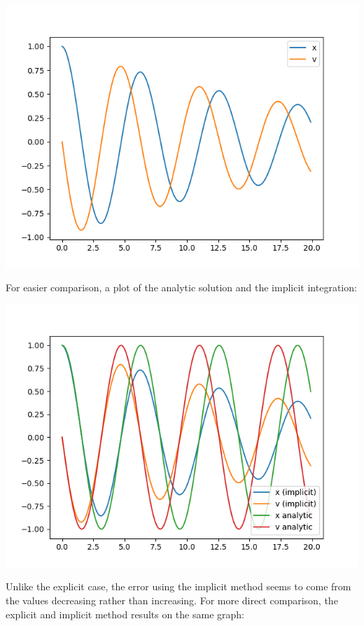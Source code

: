 \documentclass{article}
\begin{document}
\includegraphics[scale=0.9]{images/implicit_solution.png}

For easier comparison, a plot of the analytic solution and the implicit integration:

\includegraphics[scale=0.9]{images/analytic_vs_implicit.png}

Unlike the explicit case, the error using the implicit method seems to come from the values decreasing rather than increasing. For more direct comparison, the explicit and implicit method results on the same graph:
\end{document}
